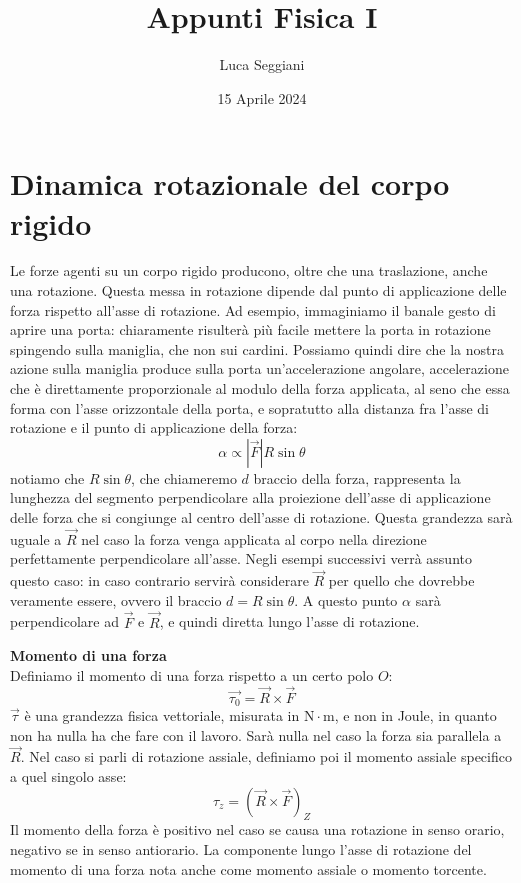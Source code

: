 \documentclass[a4paper,12pt]{article}
\title{Appunti Fisica I}
\author{Luca Seggiani}
\date{15 Aprile 2024}
\begin{document}
\maketitle
\section{Dinamica rotazionale del corpo rigido}
Le forze agenti su un corpo rigido producono, oltre che una traslazione, anche una rotazione. Questa messa
in rotazione dipende dal punto di applicazione delle forza rispetto all'asse di rotazione. Ad esempio, immaginiamo
il banale gesto di aprire una porta: chiaramente risulterà più facile mettere la porta in rotazione spingendo sulla maniglia,
che non sui cardini. Possiamo quindi dire che la nostra azione sulla maniglia produce sulla porta un'accelerazione angolare,
accelerazione che è direttamente proporzionale al modulo della forza applicata, al seno che essa forma con l'asse
orizzontale della porta, e sopratutto alla distanza fra l'asse di rotazione e il punto di applicazione della forza:
$$ \alpha \propto |\vec{F}|R\sin{\theta}$$
notiamo che $R\sin{\theta}$, che chiameremo $d$ braccio della forza, rappresenta la lunghezza del segmento
perpendicolare alla proiezione dell'asse di applicazione delle forza che si congiunge al centro dell'asse di rotazione.
Questa grandezza sarà uguale a $\vec{R}$ nel caso la forza venga applicata al corpo nella direzione perfettamente perpendicolare
all'asse. Negli esempi successivi verrà assunto questo caso: in caso contrario servirà considerare $\vec{R}$ per quello che dovrebbe
veramente essere, ovvero il braccio $d = R\sin{\theta}$.
A questo punto $\alpha$ sarà perpendicolare ad $\vec{F}$ e $\vec{R}$, e quindi diretta lungo l'asse di rotazione.
\par\smallskip
\textbf{Momento di una forza} \\
Definiamo il momento di una forza rispetto a un certo polo $O$:
$$ \vec{\tau_0} = \vec{R} \times \vec{F} $$
$\vec{\tau}$ è una grandezza fisica vettoriale, misurata in $\mathrm{N}\cdot\mathrm{m}$, e non in Joule, in
quanto non ha nulla ha che fare con il lavoro. Sarà nulla nel caso la forza sia parallela a $\vec{R}$. Nel
caso si parli di rotazione assiale, definiamo poi il momento assiale specifico a quel singolo asse:
$$ \tau_z = (\vec{R} \times \vec{F})_Z$$
Il momento della forza è positivo nel caso se causa una rotazione in senso orario, negativo se in senso antiorario.
La componente lungo l'asse di rotazione del momento di una forza nota anche come momento assiale o momento torcente.
\end{document}
